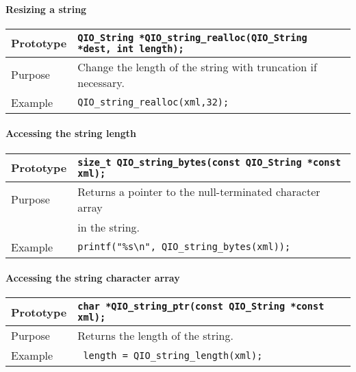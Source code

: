 \documentclass{article}
\newcommand{\QIOstring}{{\tt QIO\_String }}
\begin{document}
\paragraph{Resizing a string}

\begin{flushleft}
  \begin{tabular}{|l|l|}
  \hline
  Prototype      & \QIOstring \verb|*QIO_string_realloc(|\QIOstring \verb|*dest, int length);|\\
    \hline
  Purpose        & Change the length of the string with truncation if necessary. \\
   \hline
  Example        & \verb|QIO_string_realloc(xml,32);| \\
   \hline
 \end{tabular}
\end{flushleft}
%

\paragraph{Accessing the string length}

\begin{flushleft}
  \begin{tabular}{|l|l|}
  \hline
  Prototype      & \verb|size_t QIO_string_bytes(const |\QIOstring \verb|*const xml);|\\
    \hline
  Purpose        & Returns a pointer to the null-terminated character array \\
                 & in the string. \\
   \hline
  Example        & \verb|printf("%s\n", QIO_string_bytes(xml));| \\
   \hline
 \end{tabular}
\end{flushleft}
%
\paragraph{Accessing the string character array}

\begin{flushleft}
  \begin{tabular}{|l|l|}
  \hline
  Prototype      & \verb|char *QIO_string_ptr(const |\QIOstring \verb|*const xml);|\\
    \hline
  Purpose        & Returns the length of the string. \\
   \hline
  Example        & \verb| length = QIO_string_length(xml);| \\
   \hline
 \end{tabular}
\end{flushleft}
%
\end{document}
